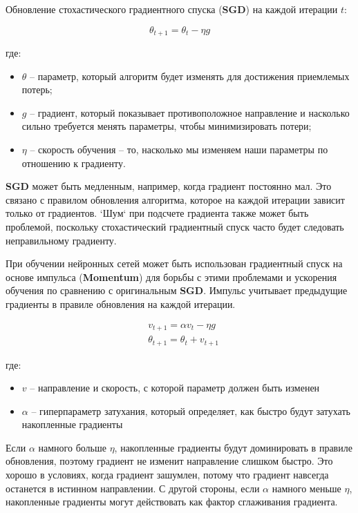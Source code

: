 {}\documentclass{article}
\begin{document}
    Обновление стохастического градиентного спуска (\textbf{SGD}) на каждой итерации $t$:

    \[
        \theta_{t+1} = \theta_t - \eta g
    \]

    где:

    \begin{itemize}
        \item $\theta$ -- параметр, который алгоритм будет изменять для достижения приемлемых потерь;
        \item $g$ -- градиент, который показывает противоположное направление
              и насколько сильно требуется менять параметры, чтобы минимизировать потери;
        \item $\eta$ -- скорость обучения – то, насколько мы изменяем наши параметры по отношению к градиенту.
    \end{itemize}

    \textbf{SGD} может быть медленным, например, когда градиент постоянно мал.
    Это связано с правилом обновления алгоритма, которое на каждой итерации зависит только от градиентов.
    `Шум` при подсчете градиента также может быть проблемой, поскольку стохастический градиентный спуск
    часто будет следовать неправильному градиенту.

    При обучении нейронных сетей может быть использован градиентный спуск на основе импульса (\textbf{Momentum})
    для борьбы с этими проблемами и ускорения обучения по сравнению с оригинальным \textbf{SGD}\@.
    Импульс учитывает предыдущие градиенты в правиле обновления на каждой итерации.

    \begin{align}
        & v_{t+1} = \alpha v_t - \eta g \\
        & \theta_{t+1} = \theta_t + v_{t+1}
    \end{align}

    где:

    \begin{itemize}
        \item $v$ -- направление и скорость, с которой параметр должен быть изменен
        \item $\alpha$ -- гиперпараметр затухания, который определяет, как быстро будут затухать накопленные градиенты \\
        \end{itemize}
    Если $\alpha$ намного больше $\eta$, накопленные градиенты будут доминировать в правиле обновления,
    поэтому градиент не изменит направление слишком быстро.
    Это хорошо в условиях, когда градиент зашумлен, потому что градиент навсегда останется в истинном направлении.
    С другой стороны, если $\alpha$ намного меньше $\eta$, накопленные градиенты могут действовать как
    фактор сглаживания градиента.
\end{document}

